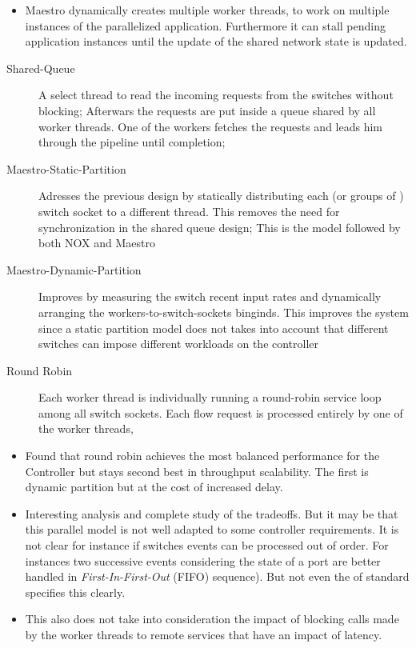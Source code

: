 \begin{itemize}
\begin{itemize}
\item Maestro dynamically creates multiple worker threads, to work on multiple instances of the parallelized application. Furthermore it can stall pending application instances until the update of the shared network state is updated. 
\end{itemize}

\begin{description}
\item[Shared-Queue] A select thread to read the incoming requests from the switches without blocking; Afterwars the requests are put inside a queue shared by all worker threads. One of the workers fetches the requests and leads him through the pipeline until completion;
\item[Maestro-Static-Partition] Adresses the previous design by statically distributing each (or groups of ) switch socket to a different thread. This removes the need for synchronization in the shared queue design; This is the model followed by both NOX and Maestro 
\item[Maestro-Dynamic-Partition] Improves by measuring the switch recent input rates and dynamically arranging the workers-to-switch-sockets binginds. This improves the system since a static partition model does not takes into account that different switches can impose different workloads on the controller 
\item[Round Robin ] Each worker thread is individually running a round-robin service loop among all switch sockets. Each flow request is processed entirely by one of the worker threads, 
\end{description}

\begin{itemize}
\item Found that round robin achieves the most balanced performance for the Controller but stays second best in throughput scalability. The first is dynamic partition but at the cost of increased delay. 
\item Interesting analysis and complete study of the tradeoffs. But it may be that this parallel model is not well adapted to some controller requirements. It is not clear for instance if switches events can be processed out of order. For instances two successive events considering the state of a port are better handled in \emph{First-In-First-Out} (FIFO) sequence). But not even the \gls{of} standard specifies this clearly. 
\item This also does not take into consideration the impact of blocking calls made by the worker threads to remote services that have an impact of latency. 
\end{itemize}


\end{itemize}
